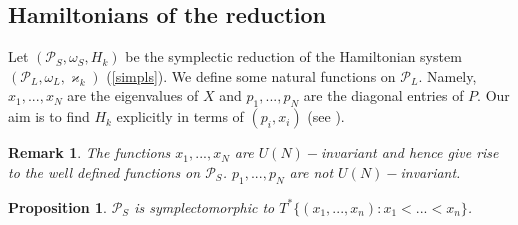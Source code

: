 \documentclass[12pt]{article}
\newtheorem{pr}{Proposition}[section]
\newtheorem{rem}{Remark}[section]
\numberwithin{equation}{section}
\theoremstyle{definition}
\begin{document}
\subsection{Hamiltonians of the reduction}
Let $(\mathcal{P}_{S}, \omega_{S}, H_{k})$ be the symplectic reduction of the Hamiltonian system $(\mathcal{P}_{L}, \omega_{L}, \varkappa_{k})$ (\ref{simpls}). We define some natural functions on $\mathcal{P}_{L}$. Namely, $x_1, ..., x_N$ are the eigenvalues of $X$ and $p_1, ..., p_N$ are the diagonal entries of $P$.
Our aim is to find $H_k$ explicitly in terms of $(p_i, x_i)$ (see \cite{KKS78}).
\begin{rem}\normalfont
    The functions $x_1, ..., x_N$ are $U(N)-$invariant and hence give rise to the well defined functions on $\mathcal{P}_{S}$. $p_1 , ..., p_N$ are not $U(N)-$invariant.
\end{rem}
\begin{pr}
    $\mathcal{P}_{S}$ is symplectomorphic to $T^{*}\{(x_1 , ..., x_n ): x_1 < ... < x_n \}$.
\end{pr}
\end{document}

